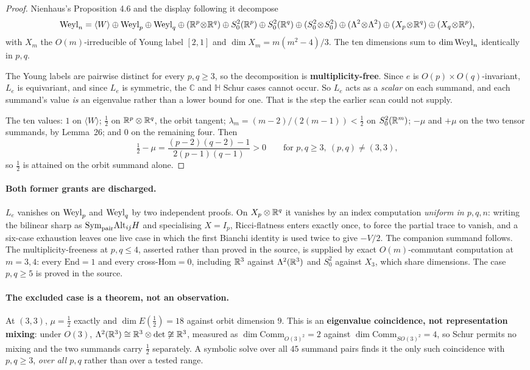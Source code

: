 \begin{proof}
Nienhaus's Proposition 4.6 and the display following it decompose
\[
\Weyl_n=\langle W\rangle\oplus\Weyl_p\oplus\Weyl_q\oplus(\R^p\!\otimes\!\R^q)\oplus S^2_0(\R^p)\oplus S^2_0(\R^q)\oplus(S^2_0\!\otimes\!S^2_0)\oplus(\Lambda^2\!\otimes\!\Lambda^2)\oplus(X_p\!\otimes\!\R^q)\oplus(X_q\!\otimes\!\R^p),
\]
with $X_m$ the $O(m)$-irreducible of Young label $[2,1]$ and $\dim X_m=m(m^2-4)/3$. The ten dimensions sum to $\dim\mathrm{Weyl}_n$ identically in $p,q$.

The Young labels are pairwise distinct for every $p,q\ge3$, so the decomposition is \textbf{multiplicity-free}. Since $e$ is $O(p)\times O(q)$-invariant, $L_e$ is equivariant, and since $L_e$ is symmetric, the $\mathbb C$ and $\mathbb H$ Schur cases cannot occur. So $L_e$ acts as a \emph{scalar} on each summand, and each summand's value \emph{is} an eigenvalue rather than a lower bound for one. That is the step the earlier scan could not supply.

The ten values: $1$ on $\langle W\rangle$; $\tfrac12$ on $\mathbb{R}^p\otimes\mathbb{R}^q$, the orbit tangent; $\lambda_m=(m-2)/(2(m-1))<\tfrac12$ on $S^2_0(\mathbb{R}^m)$; $-\mu$ and $+\mu$ on the two tensor summands, by Lemma~26; and $0$ on the remaining four. Then
\[
\tfrac12-\mu=\frac{(p-2)(q-2)-1}{2(p-1)(q-1)}>0\qquad\text{for }p,q\ge3,\ (p,q)\ne(3,3),
\]
so $\tfrac12$ is attained on the orbit summand alone.
\end{proof}

\paragraph{Both former grants are discharged.} $L_e$ vanishes on $\mathrm{Weyl}_p$ and $\mathrm{Weyl}_q$ by two independent proofs. On $X_p\otimes\mathbb{R}^q$ it vanishes by an index computation \emph{uniform in $p,q,n$}: writing the bilinear sharp as $\mathrm{Sym}_{\text{pair}}\mathrm{Alt}_{ij}H$ and specialising $X=I_p$, Ricci-flatness enters exactly once, to force the partial trace to vanish, and a six-case exhaustion leaves one live case in which the first Bianchi identity is used twice to give $-V/2$. The companion summand follows. The multiplicity-freeness at $p,q\le4$, asserted rather than proved in the source, is supplied by exact $O(m)$-commutant computation at $m=3,4$: every $\mathrm{End}=1$ and every cross-$\mathrm{Hom}=0$, including $\mathbb{R}^3$ against $\Lambda^2(\mathbb{R}^3)$ and $S^2_0$ against $X_3$, which share dimensions. The case $p,q\ge5$ is proved in the source.

\paragraph{The excluded case is a theorem, not an observation.} At $(3,3)$, $\mu=\tfrac12$ exactly and $\dim E(\tfrac12)=18$ against orbit dimension $9$. This is an \textbf{eigenvalue coincidence, not representation mixing}: under $O(3)$, $\Lambda^2(\mathbb{R}^3)\cong\mathbb{R}^3\otimes\det\not\cong\mathbb{R}^3$, measured as $\dim\mathrm{Comm}_{O(3)^2}=2$ against $\dim\mathrm{Comm}_{SO(3)^2}=4$, so Schur permits no mixing and the two summands carry $\tfrac12$ separately. A symbolic solve over all $45$ summand pairs finds it the only such coincidence with $p,q\ge3$, \emph{over all $p,q$} rather than over a tested range.

